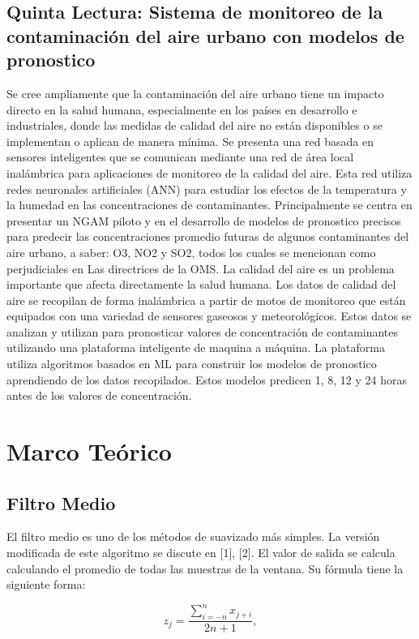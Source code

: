 \documentclass[10pt,a4paper]{article}
\begin{document}
\begin{multicols}{2}
\begin{itemize}
\subsection{Quinta Lectura: Sistema de monitoreo de la contaminación del aire urbano con modelos de pronostico}
Se cree ampliamente que la contaminación del aire
urbano tiene un impacto directo en la salud humana,
especialmente en los países en desarrollo e industriales,
donde las medidas de calidad del aire no están disponibles
o se implementan o aplican de manera mínima.
Se presenta una red basada en sensores inteligentes que
se comunican mediante una red de área local inalámbrica
para aplicaciones de monitoreo de la calidad del aire.
Esta red utiliza redes neuronales artificiales (ANN)
para estudiar los efectos de la temperatura y la humedad
en las concentraciones de contaminantes. Principalmente
se centra en presentar un NGAM piloto y
en el desarrollo de modelos de pronostico precisos para
predecir las concentraciones promedio futuras de algunos
contaminantes del aire urbano, a saber: O3, NO2 y
SO2, todos los cuales se mencionan como perjudiciales
en Las directrices de la OMS.
La calidad del aire es un problema importante que afecta
directamente la salud humana. Los datos de calidad
del aire se recopilan de forma inalámbrica a partir de
motos de monitoreo que están equipados con una variedad
de sensores gaseosos y meteorológicos. Estos datos
se analizan y utilizan para pronosticar valores de concentración
de contaminantes utilizando una plataforma
inteligente de maquina a máquina. La plataforma utiliza
algoritmos basados en ML para construir los modelos
de pronostico aprendiendo de los datos recopilados.
Estos modelos predicen 1, 8, 12 y 24 horas antes de los
valores de concentración.



\section{Marco Teórico}
\subsection{Filtro Medio}
El filtro medio es uno de los métodos de suavizado más simples. La versión modificada de este algoritmo se discute en [1], [2]. El valor de salida se calcula calculando el promedio de todas las muestras de la ventana. Su fórmula tiene la siguiente forma:

\begin{equation}
z_{j} = \frac{\sum_{i=-n}^n  x_{j+i}}{2n+1},
\end{equation}


\end{itemize}
\end{multicols}
\end{document}
